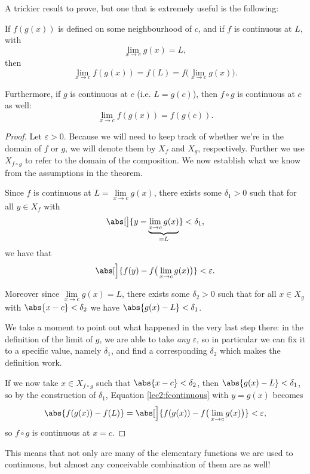 \noindent
A trickier result to prove, but one that is extremely useful is the following:

\begin{theorem}
	If $f(g(x))$ is defined on some neighbourhood of $c$, and if $f$ is continuous at $L$, with
	\[
		\lim_{x \to c} g(x) = L,
	\]
	then
	\[
		\lim_{x \to c} f(g(x)) = f(L) = f \big ( \lim_{x \to c} g(x) \big ).
	\]

	\noindent
	Furthermore, if $g$ is continuous at $c$ (i.e. $L = g(c)$), then $f \circ g$ is continuous at $c$ as well:
	\[
		\lim_{x \to c} f(g(x)) = f(g(c)).
	\]
\end{theorem}

\begin{proof}
	Let $\varepsilon > 0$.
	Because we will need to keep track of whether we're in the domain of $f$ or $g$, we will denote them by $X_f$ and $X_g$, respectively.
	Further we use $X_{f \circ g}$ to refer to the domain of the composition.
	We now establish what we know from the assumptions in the theorem.

	Since $f$ is continuous at $L = \lim\limits_{x \to c} g(x)$, there exists some $\delta_1 > 0$ such that for all $y \in X_f$ with
	\[
		\abs[\big]{y - \underbrace{\lim_{x \to c} g(x)}_{= L}} < \delta_1,
	\]
	we have that
	\begin{equation}\label{lec2:fcontinuous}
		\abs[\Big]{f(y) - f \big ( \lim_{x \to c} g(x) \big ) } < \varepsilon.
	\end{equation}

	\noindent
	Moreover since $\lim\limits_{x \to c} g(x) = L$, there exists some $\delta_2 > 0$ such that for all $x \in X_g$ with $\abs{x - c} < \delta_2$ we have $\abs{g(x) - L} < \delta_1$.

	We take a moment to point out what happened in the very last step there: in the definition of the limit of $g$, we are able to take \emph{any} $\varepsilon$, so in particular we can fix it to a specific value, namely $\delta_1$, and find a corresponding $\delta_2$ which makes the definition work.

	If we now take $x \in X_{f \circ g}$ such that $\abs{x - c} < \delta_2$, then $\abs{g(x) - L} < \delta_1$, so by the construction of $\delta_1$, Equation \eqref{lec2:fcontinuous} with $y = g(x)$ becomes
	\[
		\abs{f(g(x)) - f(L)} = \abs[\Big]{f(g(x)) - f \big ( \lim_{x \to c} g(x) \big )} < \varepsilon,
	\]
	so $f \circ g$ is continuous at $x = c$.
\end{proof}

\noindent
This means that not only are many of the elementary functions we are used to continuous, but almost any conceivable combination of them are as well!

